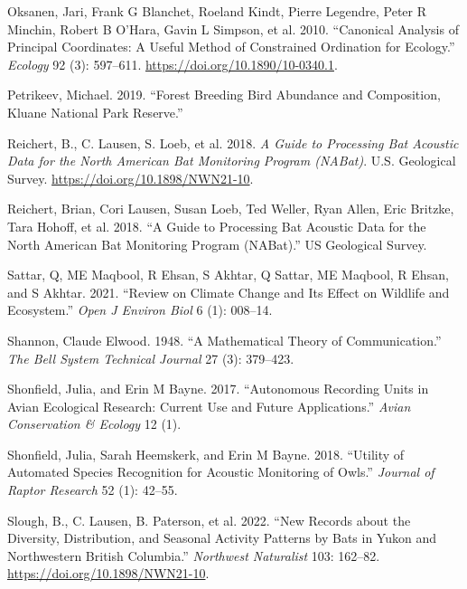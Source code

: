 \documentclass[
  letterpaper,
  DIV=11,
  numbers=noendperiod,
  oneside]{scrartcl}
\newlength{\cslhangindent}
\newenvironment{CSLReferences}[2] %
 {\begin{list}{}{%
  \setlength{\itemindent}{0pt}
  \setlength{\leftmargin}{0pt}
  \setlength{\parsep}{0pt}
  \ifodd #1
   \setlength{\leftmargin}{\cslhangindent}
   \setlength{\itemindent}{-1\cslhangindent}
  \fi
  \setlength{\itemsep}{#2\baselineskip}}}
 {\end{list}}
\begin{document}
\begin{CSLReferences}{1}{0}
Oksanen, Jari, Frank G Blanchet, Roeland Kindt, Pierre Legendre, Peter R
Minchin, Robert B O'Hara, Gavin L Simpson, et al. 2010. {``Canonical
Analysis of Principal Coordinates: A Useful Method of Constrained
Ordination for Ecology.''} \emph{Ecology} 92 (3): 597--611.
\url{https://doi.org/10.1890/10-0340.1}.

Petrikeev, Michael. 2019. {``Forest Breeding Bird Abundance and
Composition, Kluane National Park Reserve.''}

Reichert, B., C. Lausen, S. Loeb, et al. 2018. \emph{A Guide to
Processing Bat Acoustic Data for the North American Bat Monitoring
Program (NABat)}. U.S. Geological Survey.
\url{https://doi.org/10.1898/NWN21-10}.

Reichert, Brian, Cori Lausen, Susan Loeb, Ted Weller, Ryan Allen, Eric
Britzke, Tara Hohoff, et al. 2018. {``A Guide to Processing Bat Acoustic
Data for the North American Bat Monitoring Program (NABat).''} US
Geological Survey.

Sattar, Q, ME Maqbool, R Ehsan, S Akhtar, Q Sattar, ME Maqbool, R Ehsan,
and S Akhtar. 2021. {``Review on Climate Change and Its Effect on
Wildlife and Ecosystem.''} \emph{Open J Environ Biol} 6 (1): 008--14.

Shannon, Claude Elwood. 1948. {``A Mathematical Theory of
Communication.''} \emph{The Bell System Technical Journal} 27 (3):
379--423.

Shonfield, Julia, and Erin M Bayne. 2017. {``Autonomous Recording Units
in Avian Ecological Research: Current Use and Future Applications.''}
\emph{Avian Conservation \& Ecology} 12 (1).

Shonfield, Julia, Sarah Heemskerk, and Erin M Bayne. 2018. {``Utility of
Automated Species Recognition for Acoustic Monitoring of Owls.''}
\emph{Journal of Raptor Research} 52 (1): 42--55.

Slough, B., C. Lausen, B. Paterson, et al. 2022. {``New Records about
the Diversity, Distribution, and Seasonal Activity Patterns by Bats in
Yukon and Northwestern British Columbia.''} \emph{Northwest Naturalist}
103: 162--82. \url{https://doi.org/10.1898/NWN21-10}.


\end{CSLReferences}
\end{document}
